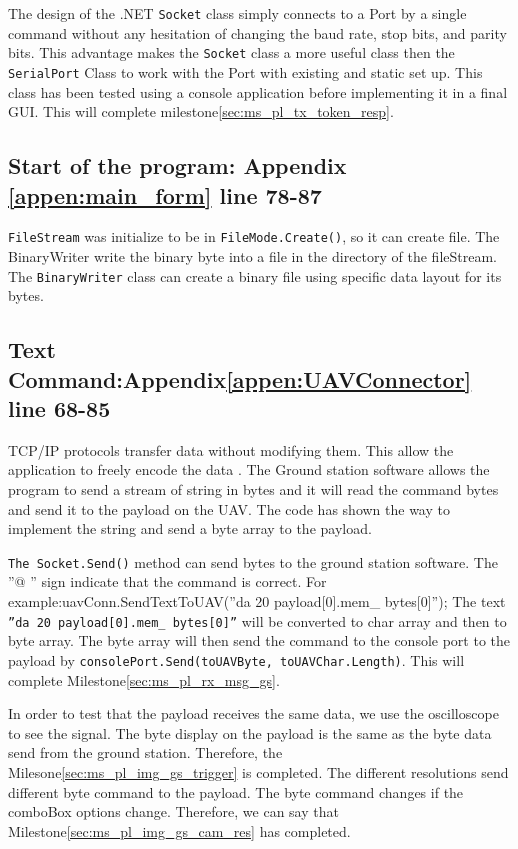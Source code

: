 The design of the .NET \texttt{Socket} class simply connects to a Port by a single command without any hesitation of changing the baud rate, stop bits, and parity bits. 
This advantage makes the \texttt{Socket} class a more useful class then the \texttt{SerialPort} Class to work with the Port with existing and static set up. 
This class has been tested using a console application before implementing it in a final GUI. 
This will complete milestone\ref{sec:ms_pl_tx_token_resp}.

\subsection{Start of the program: Appendix \ref{appen:main_form} line 78-87}%
\texttt{FileStream} was initialize to be in \texttt{FileMode.Create()}, so it can create file. The BinaryWriter write the binary byte into a file in the directory of the fileStream.
The \texttt{BinaryWriter} class can create a binary file using specific data layout for its bytes. 


\subsection{Text Command:Appendix\ref{appen:UAVConnector} line 68-85}
TCP/IP protocols transfer data without modifying them. 
This allow the application to freely encode the data \cite{davidB}.
The Ground station software allows the program to send a stream of string in bytes and it will read the command bytes and send it to the payload on the UAV. The code has shown the way to implement the string and send a byte array to the payload.

\texttt{The Socket.Send()} method can send bytes to the ground station software. The ''@ '' sign indicate that the command is correct. For example:uavConn.SendTextToUAV(''da 20 payload[0].mem\_ bytes[0]'');
The text \texttt{''da 20 payload[0].mem\_ bytes[0]''} will be converted to char array and then to byte array. The byte array will then send the command to the console port to the payload by \texttt{consolePort.Send(toUAVByte, toUAVChar.Length)}. This will complete Milestone\ref{sec:ms_pl_rx_msg_gs}.

In order to test that the payload receives the same data, we use the oscilloscope to see the signal. The byte display on the payload is the same as the byte data send from the ground station. Therefore, the Milesone\ref{sec:ms_pl_img_gs_trigger} is completed. The different resolutions send different byte command to the payload. The byte command changes if the comboBox options change. Therefore, we can say that Milestone\ref{sec:ms_pl_img_gs_cam_res} has completed.


